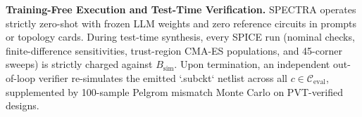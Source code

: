 \textbf{Training-Free Execution and Test-Time Verification.} \textsc{SPECTRA} operates strictly zero-shot with frozen LLM weights and zero reference circuits in prompts or topology cards. During test-time synthesis, every SPICE run (nominal checks, finite-difference sensitivities, trust-region CMA-ES populations, and 45-corner sweeps) is strictly charged against $B_{\text{sim}}$. Upon termination, an independent out-of-loop verifier re-simulates the emitted `.subckt` netlist across all $c \in \mathcal{C}_{\text{eval}}$, supplemented by 100-sample Pelgrom mismatch Monte Carlo on PVT-verified designs.
